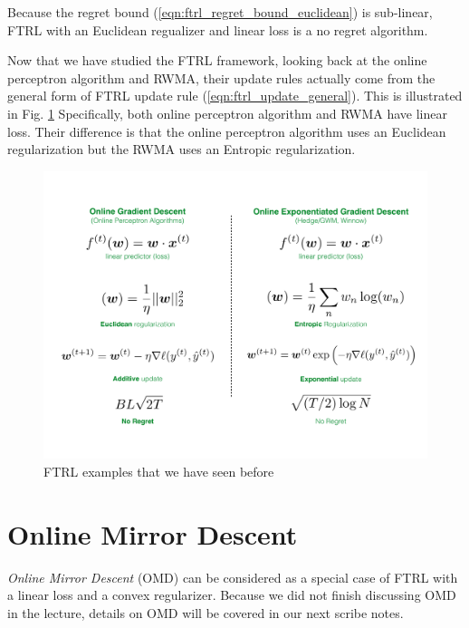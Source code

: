 \documentclass[11pt]{article}
\begin{document}
Because the regret bound (\ref{eqn:ftrl_regret_bound_euclidean}) is sub-linear, FTRL with an Euclidean regualizer and linear loss is a no regret algorithm.

Now that we have studied the FTRL framework, looking back at the online perceptron algorithm and RWMA, their update rules actually come from the general form of FTRL update rule (\ref{eqn:ftrl_update_general}). This is illustrated in Fig. \ref{fig:ftrl_examples} Specifically, both online perceptron algorithm and RWMA have linear loss. Their difference is that the online perceptron algorithm uses an Euclidean regularization but the RWMA uses an Entropic regularization.

\begin{figure}[h]
    \centering
    \includegraphics[width=\textwidth]{figure/ftrl_examples.pdf}
    \caption{FTRL examples that we have seen before}
    \label{fig:ftrl_examples}
\end{figure}

\section{Online Mirror Descent}
\textit{Online Mirror Descent} (OMD) can be considered as a special case of FTRL with a linear loss and a convex regularizer. Because we did not finish discussing OMD in the lecture, details on OMD will be covered in our next scribe notes.

\newpage

{


}
\end{document}
